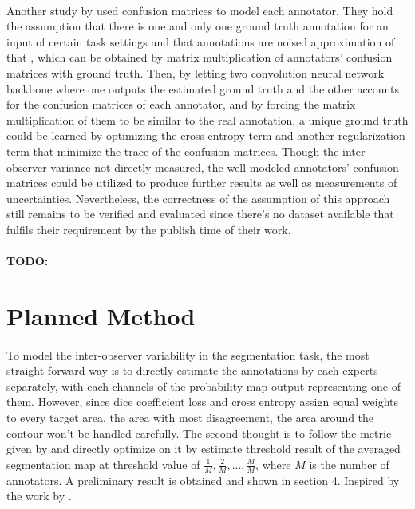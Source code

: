 \documentclass[12pt]{extarticle}
\begin{document}
\paragraph{}
Another study by \cite{zhang2020disentangling} used confusion matrices to
model each annotator. They hold the assumption that there is one and
only one ground truth annotation for an input of certain task settings and
that annotations are noised approximation of that
, which can be obtained by matrix multiplication of annotators' 
confusion matrices with ground truth. Then, by letting two convolution neural network backbone
where one outputs the estimated ground truth and the other accounts for the confusion matrices
of each annotator, and by forcing the matrix multiplication of them to be similar to the
real annotation, a unique ground truth could be learned by optimizing the cross entropy term
and another regularization term that minimize the trace of the confusion matrices.
Though the inter-observer variance not directly measured, the well-modeled annotators'
confusion matrices could be utilized to produce further results
as well as measurements of uncertainties.
Nevertheless, the correctness of the assumption of this approach
still remains to be verified and evaluated since there's no dataset available 
that fulfils their requirement by the publish time of their work.
\paragraph{}
\textbf{TODO: }

\section{Planned Method}
\paragraph{}
To model the inter-observer variability in the segmentation task, the most straight forward way is to 
directly estimate the annotations by each experts separately, with each channels of 
the probability map output representing one of them. However, since dice coefficient loss and cross entropy 
assign equal weights to every target area, the area with most disagreement, 
the area around the contour won't be handled carefully\cite{Kervadec_2021}.
The second thought is to follow the metric given by \cite{qubiq} and directly optimize on it by estimate threshold 
result of the averaged segmentation map at threshold value of $\frac{1}{M}, \frac{2}{M}, ..., \frac{M}{M}$, 
where $M$ is the number of annotators. A preliminary result is obtained and shown in section 4.
Inspired by the work by \cite{zhang2020disentangling}. 
\end{document}
